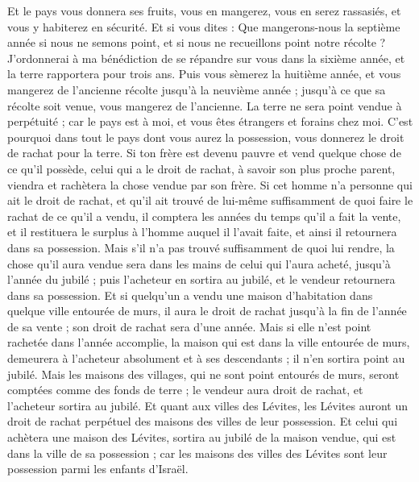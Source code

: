 \begin{multicols}{2}
Et le pays vous donnera ses fruits, vous en mangerez, vous en serez rassasiés, et vous y habiterez en sécurité.
Et si vous dites : Que mangerons-nous la septième année si nous ne semons point, et si nous ne recueillons point notre récolte ?
J'ordonnerai à ma bénédiction de se répandre sur vous dans la sixième année, et la terre rapportera pour trois ans.
Puis vous sèmerez la huitième année, et vous mangerez de l'ancienne récolte jusqu'à la neuvième année ; jusqu'à ce que sa récolte soit venue, vous mangerez de l'ancienne.
La terre ne sera point vendue à perpétuité ; car le pays est à moi, et vous êtes étrangers et forains chez moi.
C'est pourquoi dans tout le pays dont vous aurez la possession, vous donnerez le droit de rachat pour la terre.
Si ton frère est devenu pauvre et vend quelque chose de ce qu'il possède, celui qui a le droit de rachat, à savoir son plus proche parent, viendra et rachètera la chose vendue par son frère.
Si cet homme n'a personne qui ait le droit de rachat, et qu'il ait trouvé de lui-même suffisamment de quoi faire le rachat de ce qu'il a vendu,
il comptera les années du temps qu'il a fait la vente, et il restituera le surplus à l'homme auquel il l'avait faite, et ainsi il retournera dans sa possession.
Mais s'il n'a pas trouvé suffisamment de quoi lui rendre, la chose qu'il aura vendue sera dans les mains de celui qui l'aura acheté, jusqu'à l'année du jubilé ; puis l'acheteur en sortira au jubilé, et le vendeur retournera dans sa possession.
Et si quelqu'un a vendu une maison d'habitation dans quelque ville entourée de murs, il aura le droit de rachat jusqu'à la fin de l'année de sa vente ; son droit de rachat sera d'une année.
Mais si elle n'est point rachetée dans l'année accomplie, la maison qui est dans la ville entourée de murs, demeurera à l'acheteur absolument et à ses descendants ; il n'en sortira point au jubilé.
Mais les maisons des villages, qui ne sont point entourés de murs, seront comptées comme des fonds de terre ; le vendeur aura droit de rachat, et l'acheteur sortira au jubilé.
Et quant aux villes des Lévites, les Lévites auront un droit de rachat perpétuel des maisons des villes de leur possession.
Et celui qui achètera une maison des Lévites, sortira au jubilé de la maison vendue, qui est dans la ville de sa possession ; car les maisons des villes des Lévites sont leur possession parmi les enfants d'Israël.

\end{multicols}
